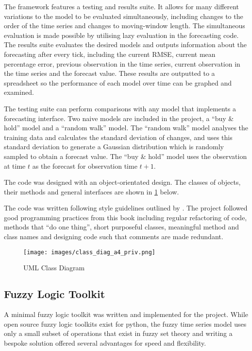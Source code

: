 \documentclass[12pt, oneside, a4paper]{article}
\theoremstyle{definition}
\begin{document}
The framework features a testing and results suite. It allows for many different variations to the model to be evaluated simultaneously, including changes to the order of the time series and changes to moving-window length. The simultaneous evaluation is made possible by utilising lazy evaluation in the forecasting code. The results suite evaluates the desired models and outputs information about the forecasting after every tick, including the current RMSE, current mean percentage error, previous observation in the time series, current observation in the time series and the forecast value. These results are outputted to a spreadsheet so the performance of each model over time can be graphed and examined.

The testing suite can perform comparisons with any model that implements a forecasting interface. Two naive models are included in the project, a ``buy \& hold'' model and a ``random walk'' model. The ``random walk'' model analyses the training data and calculates the standard deviation of changes, and uses this standard deviation to generate a Gaussian distribution which is randomly sampled to obtain a forecast value. The ``buy \& hold'' model uses the observation at time $t$ as the forecast for observation time $t+1$.

The code was designed with an object-orientated design. The classes of objects, their methods and general interfaces are shown in \cref{uml} below. 

The code was written following style guidelines outlined by \cite{bobmartin}. The project followed good programming practices from this book including regular refactoring of code, methods that ``do one thing'', short purposeful classes, meaningful method and class names and designing code such that comments are made redundant.

\begin{figure}[H]
    \centering
    \caption{UML Class Diagram}
    \texttt{[image: images/class\_diag\_a4\_priv.png]}
    \label{uml}
\end{figure}
\newpage


\subsection{Fuzzy Logic Toolkit}

A minimal fuzzy logic toolkit was written and implemented for the project. While open source fuzzy logic toolkits exist for python, the fuzzy time series model uses only a small subset of operations that exist in fuzzy set theory and writing a bespoke solution offered several advantages for speed and flexibility.
\end{document}
